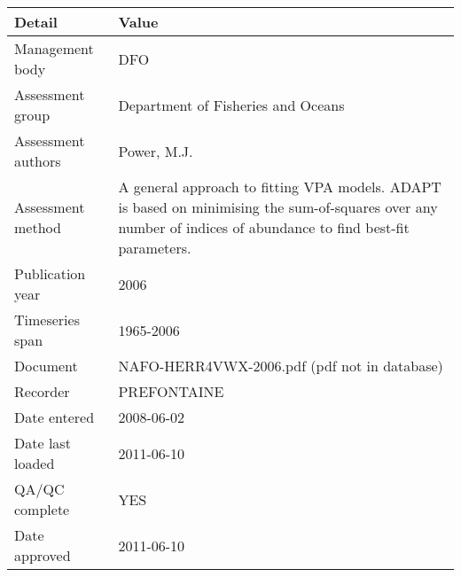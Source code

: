 \begin{table}[htb]
\centering
\begin{tabular}{lp{7cm}}
\toprule
Detail & Value \\
\midrule
Management body    & DFO                                                                                                                                                            \\
Assessment group   & Department of Fisheries and Oceans                                                                                                                             \\
Assessment authors & Power, M.J.                                                                                                                                                    \\
Assessment method  & A general approach to fitting VPA models. ADAPT is based on minimising the sum-of-squares over any number of indices of abundance to find best-fit parameters. \\
Publication year   & 2006                                                                                                                                                           \\
Timeseries span    & 1965-2006                                                                                                                                                      \\
Document           & NAFO-HERR4VWX-2006.pdf (pdf not in database)                                                                                                                   \\
Recorder           & PREFONTAINE                                                                                                                                                    \\
Date entered       & 2008-06-02                                                                                                                                                     \\
Date last loaded   & 2011-06-10                                                                                                                                                     \\
QA/QC complete     & YES                                                                                                                                                            \\
Date approved      & 2011-06-10                                                                                                                                                     \\
\bottomrule
\end{tabular}
\label{tab:assessdet}
\end{table}
